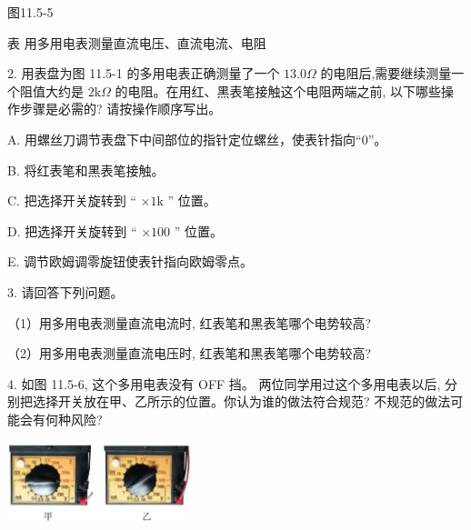 \documentclass[10pt]{article}
\begin{document}
图11.5-5

表 用多用电表测量直流电压、直流电流、电阻

\begin{center}
\end{center}

2. 用表盘为图 11.5-1 的多用电表正确测量了一个 \({13.0\Omega }\) 的电阻后,需要继续测量一个阻值大约是 \(2\mathrm{k}\Omega\) 的电阻。在用红、黑表笔接触这个电阻两端之前, 以下哪些操作步骤是必需的? 请按操作顺序写出。

A. 用螺丝刀调节表盘下中间部位的指针定位螺丝，使表针指向“0”。

B. 将红表笔和黑表笔接触。

C. 把选择开关旋转到 “ \(\times 1\mathrm{k}\) ” 位置。

D. 把选择开关旋转到 “ \(\times {100}\) ” 位置。

E. 调节欧姆调零旋钮使表针指向欧姆零点。

3. 请回答下列问题。

（1）用多用电表测量直流电流时, 红表笔和黑表笔哪个电势较高?

（2）用多用电表测量直流电压时, 红表笔和黑表笔哪个电势较高?

4. 如图 11.5-6, 这个多用电表没有 OFF 挡。 两位同学用过这个多用电表以后, 分别把选择开关放在甲、乙所示的位置。你认为谁的做法符合规范? 不规范的做法可能会有何种风险?

\begin{center}
\includegraphics[max width=0.4\textwidth]{images/01911d5f-8e38-70c0-b5b8-2b399bd115b6_79_838459.jpg}
\end{center}
\end{document}
